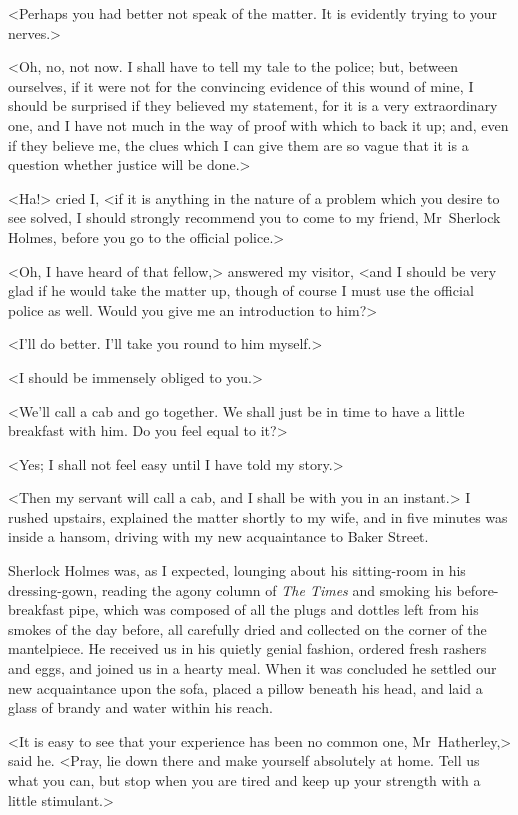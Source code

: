<Perhaps you had better not speak of the matter. It is evidently trying to your nerves.>

<Oh, no, not now. I shall have to tell my tale to the police; but, between ourselves, if it were not for the convincing evidence of this wound of mine, I should be surprised if they believed my statement, for it is a very extraordinary one, and I have not much in the way of proof with which to back it up; and, even if they believe me, the clues which I can give them are so vague that it is a question whether justice will be done.>

<Ha!> cried I, <if it is anything in the nature of a problem which you desire to see solved, I should strongly recommend you to come to my friend, Mr~Sherlock Holmes, before you go to the official police.>

<Oh, I have heard of that fellow,> answered my visitor, <and I should be very glad if he would take the matter up, though of course I must use the official police as well. Would you give me an introduction to him?>

<I'll do better. I'll take you round to him myself.>

<I should be immensely obliged to you.>

<We'll call a cab and go together. We shall just be in time to have a little breakfast with him. Do you feel equal to it?>

<Yes; I shall not feel easy until I have told my story.>

<Then my servant will call a cab, and I shall be with you in an instant.> I rushed upstairs, explained the matter shortly to my wife, and in five minutes was inside a hansom, driving with my new acquaintance to Baker Street.

Sherlock Holmes was, as I expected, lounging about his sitting-room in his dressing-gown, reading the agony column of \textit{The Times} and smoking his before-breakfast pipe, which was composed of all the plugs and dottles left from his smokes of the day before, all carefully dried and collected on the corner of the mantelpiece. He received us in his quietly genial fashion, ordered fresh rashers and eggs, and joined us in a hearty meal. When it was concluded he settled our new acquaintance upon the sofa, placed a pillow beneath his head, and laid a glass of brandy and water within his reach.

<It is easy to see that your experience has been no common one, Mr~Hatherley,> said he. <Pray, lie down there and make yourself absolutely at home. Tell us what you can, but stop when you are tired and keep up your strength with a little stimulant.>

